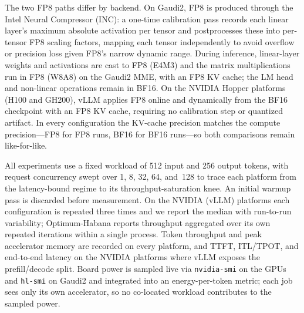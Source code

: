 The two FP8 paths differ by backend. On Gaudi2, FP8 is produced through the Intel
Neural Compressor (INC): a one-time calibration pass records each linear layer's
maximum absolute activation per tensor and postprocesses these into per-tensor FP8
scaling factors, mapping each tensor independently to avoid overflow or precision
loss given FP8's narrow dynamic range. During inference, linear-layer weights and
activations are cast to FP8 (E4M3) and the matrix multiplications run in FP8 (W8A8)
on the Gaudi2 MME, with an FP8 KV cache; the LM head and non-linear operations
remain in BF16. On the NVIDIA Hopper platforms (H100 and GH200), vLLM applies FP8
online and dynamically from the BF16 checkpoint with an FP8 KV cache, requiring no
calibration step or quantized artifact. In every configuration the KV-cache
precision matches the compute precision—FP8 for FP8 runs, BF16 for BF16 runs—so
both comparisons remain like-for-like.

All experiments use a fixed workload of 512 input and 256 output tokens, with
request concurrency swept over 1, 8, 32, 64, and~128 to trace each platform from
the latency-bound regime to its throughput-saturation knee. An initial warmup pass
is discarded before measurement. On the NVIDIA (vLLM) platforms each configuration
is repeated three times and we report the median with run-to-run variability;
Optimum-Habana reports throughput aggregated over its own repeated iterations within
a single process. Token throughput and peak accelerator memory are recorded on every
platform, and TTFT, ITL/TPOT, and end-to-end latency on the NVIDIA platforms where
vLLM exposes the prefill/decode split. Board power is sampled live via
\texttt{nvidia-smi} on the GPUs and \texttt{hl-smi} on Gaudi2 and integrated into an
energy-per-token metric; each job sees only its own accelerator, so no co-located
workload contributes to the sampled power.
